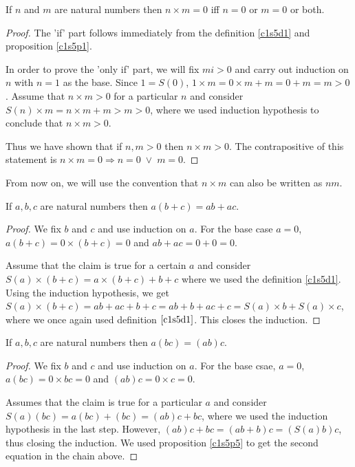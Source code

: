 \begin{prop}\label{c1s5p4}
If $n$ and $m$ are natural numbers then $n \times m = 0$ iff $n = 0$ or
$m = 0$ or both.
\end{prop}
\begin{proof}
The 'if' part follows immediately from the definition \ref{c1s5d1} and
proposition \ref{c1s5p1}.

In order to prove the 'only if' part, we will fix $mi > 0$ and carry out 
induction on $n$ with $n = 1$ as the base. Since $1 = S(0)$, $1 \times m
= 0 \times m + m = 0 + m = m > 0$. Assume that $n \times m > 0$ for a 
particular $n$ and consider $S(n) \times m = n \times m + m > m > 0$, where
we used induction hypothesis to conclude that $n \times m > 0$. 

Thus we have shown that if $n, m > 0$ then $n \times m > 0$. The 
contrapositive of this statement is $n \times m = 0 \Rightarrow n = 0
\;\lor\; m = 0$.
\end{proof}

From now on, we will use the convention that $n \times m$ can also be
written as $nm$.

\begin{prop}\label{c1s5p5}
If $a, b, c$ are natural numbers then $a(b + c) = ab + ac$.
\end{prop}
\begin{proof}
We fix $b$ and $c$ and use induction on $a$. For the base case $a = 0$, 
$a(b + c) = 0 \times (b + c) = 0$ and $ab + ac = 0 + 0 = 0$.

Assume that the claim is true for a certain $a$ and consider $S(a) \times
(b + c) = a \times (b + c) + b + c$ where we used the definition 
\ref{c1s5d1}. Using the induction hypothesis, we get $S(a) \times (b + c) =
ab + ac + b + c = ab + b + ac + c = S(a) \times b + S(a) \times c$, where
we once again used definition $\ref{c1s5d1}$. This closes the induction.
\end{proof}

\begin{prop}\label{c1s5p6}
If $a, b, c$ are natural numbers then $a(bc) = (ab)c$.
\end{prop}
\begin{proof}
We fix $b$ and $c$ and use induction on $a$. For the base csae, $a = 0$,
$a(bc) = 0 \times bc = 0$ and $(ab)c = 0 \times c = 0$.

Assumes that the claim is true for a particular $a$ and consider $S(a)(bc)
= a(bc) + (bc) = (ab)c + bc$, where we used the induction hypothesis in the
last step. However, $(ab)c + bc = (ab + b)c = (S(a)b)c$, thus closing the
induction. We used proposition \ref{c1s5p5} to get the second equation in 
the chain above.
\end{proof}

